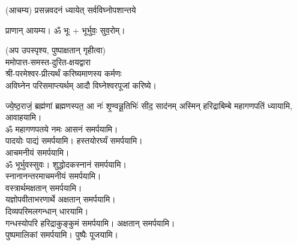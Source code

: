 
(आचम्य)
{प्रसन्नवदनं ध्यायेत् सर्वविघ्नोपशान्तये}
 
प्राणान्  आयम्य।  ॐ भूः + भूर्भुवः॒ सुव॒रोम्।
 
(अप उपस्पृश्य, पुष्पाक्षतान् गृहीत्वा)\\
ममोपात्त-समस्त-दुरित-क्षयद्वारा \\
श्री-परमेश्वर-प्रीत्यर्थं करिष्यमाणस्य कर्मणः\\
अविघ्नेन परिसमाप्त्यर्थम् आदौ विघ्नेश्वरपूजां करिष्ये।

{ज्ये॒ष्ठ॒राजं॒ ब्रह्म॑णां ब्रह्मणस्पत॒ आ नः॑ शृ॒ण्वन्नू॒तिभिः॑ सीद॒ साद॑नम्}
अस्मिन् हरिद्राबिम्बे महागणपतिं ध्यायामि, आवाहयामि।\\


ॐ महागणपतये नमः  आसनं समर्पयामि।\\
पादयोः पाद्यं समर्पयामि। हस्तयोरर्घ्यं समर्पयामि।\\
आचमनीयं समर्पयामि।\\
ॐ भूर्भुवस्सुवः। शुद्धोदकस्नानं समर्पयामि।\\
स्नानानन्तरमाचमनीयं समर्पयामि।\\
वस्त्रार्थमक्षतान् समर्पयामि।\\
यज्ञोपवीताभरणार्थे अक्षतान् समर्पयामि।\\
दिव्यपरिमलगन्धान् धारयामि।\\
गन्धस्योपरि हरिद्राकुङ्कुमं समर्पयामि। अक्षतान् समर्पयामि। \\
पुष्पमालिकां समर्पयामि। पुष्पैः पूजयामि।

